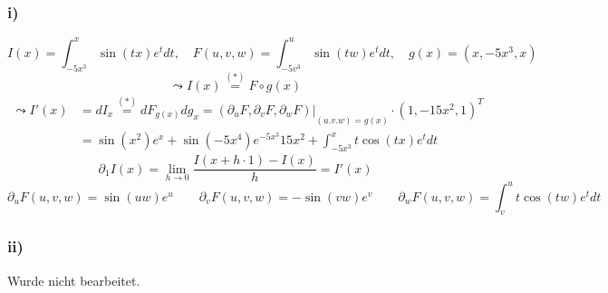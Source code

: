 \documentclass[
    accentcolor=pink,
    boxarc,
    dark_mode,
    logofile=enmpty
]{rubos-tuda-template}
\begin{document}
    \subsubsection*{i)}
    \[I(x)=\int_{-5x^3}^{x}\sin(tx)e^tdt, \quad F(u,v,w)=\int_{-5v^3}^{u}\sin(tw)e^tdt, \quad g(x)=(x,-5x^3,x)\]
    \[\leadsto I(x)\overset{(*)}{=}F\circ g(x)\]
    \begin{align*}
        \leadsto I'(x) & =dI_x\overset{(*)}{=}dF_{g(x)}dg_x=(\partial_uF,\partial_vF,\partial_wF)\big|\underset{(u.v.w)=g(x)}{}\cdot(1,-15x^2,1)^T \\
                       & =\sin(x^2)e^x+\sin(-5x^4)e^{-5x^3}15x^2+\int_{-5x^3}^{x}t\cos(tx)e^tdt
    \end{align*}
    \[\partial_1I(x)=\lim_{h\to0}\frac{I(x+h\cdot1)-I(x)}{h}=I'(x)\]
    \[\partial_uF(u,v,w)=\sin(uw)e^u\qquad\partial_vF(u,v,w)=-\sin(vw)e^v\qquad\partial_wF(u,v,w)=\int_{v}^{u}t\cos(tw)e^tdt\]

    \subsubsection*{ii)}
    \begin{anmerkung}
        Wurde nicht bearbeitet.
    \end{anmerkung}
\end{document}
